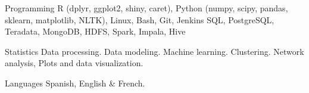 


\begin{cvskills}


\cvskill
{Programming} %
{R (dplyr, ggplot2, shiny, caret), Python (numpy, scipy, pandas, sklearn, matplotlib, NLTK), Linux, Bash, Git, Jenkins} %
\cvskill
{}
{SQL, PostgreSQL, Teradata, MongoDB, HDFS, Spark, Impala, Hive} %


\cvskill
{Statistics} %
{Data processing. Data modeling. Machine learning. Clustering. Network analysis, Plots and data visualization.} %


\cvskill
{Languages} %
{Spanish, English \& French.} %








\end{cvskills}
